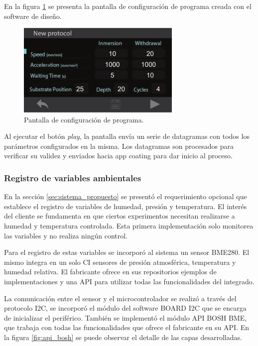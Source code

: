  
En la figura \ref{fig:stone_a} se presenta la pantalla de configuración de programa creada con el software de diseño. 

\begin{figure}[h!]
	\centering
	\includegraphics[width=0.7\textwidth]{./Figures/pantalla.png}
	\caption{Pantalla de configuración de programa.}
	\label{fig:stone_a}
\end{figure}  

Al ejecutar el botón \textit{play}, la pantalla envía un serie de datagramas con todos los parámetros configurados en la misma. Los datagramas son procesados para verificar su validez y enviados hacia app coating para dar inicio al proceso. 
 

\subsubsection{Registro de variables ambientales}

En la sección \ref{sec:sistema_propuesto} se presentó el requerimiento opcional que establece el registro de variables de humedad, presión y temperatura. El interés del cliente se fundamenta en que ciertos experimentos necesitan realizarse a humedad y temperatura controlada. Esta primera implementación solo monitorea las variables y no realiza ningún control. 

Para el registro de estas variables se incorporó al sistema un sensor BME280. El mismo integra en un solo CI sensores de presión atmosférica, temperatura y humedad relativa. El fabricante ofrece en sus repositorios \citep{web_repositorio_api_bosh} ejemplos de implementaciones y una API para utilizar todas las funcionalidades del integrado.

La comunicación entre el sensor y el microcontrolador se realizó a través del protocolo I2C, se incorporó el módulo del software BOARD I2C que se encarga de inicializar el periférico. También se implementó el módulo API BOSH BME, que trabaja con todas las funcionalidades que ofrece el fabricante en su API. En la figura \ref{fig:api_bosh} se puede observar el detalle de las capas desarrolladas.


